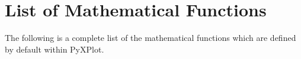 %
%
%
%
%



\chapter{List of Mathematical Functions}
\label{ch:function_list}

The following is a complete list of the mathematical functions which are defined by default within PyXPlot.

\newcommand{\funcdef}[2]{
\vspace{5mm}
\begin{samepage}
\noindent
{\large \bf #1}
\newline
\indfun{#1}
The #1 function #2
\end{samepage}

}

